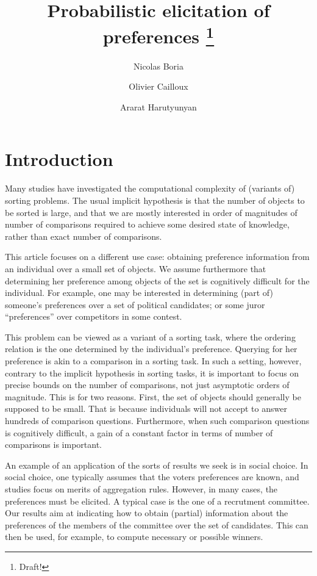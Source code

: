 \documentclass[version=3.21, pagesize, twoside=off, bibliography=totoc, DIV=calc, fontsize=12pt, a4paper]{scrartcl}
\title{Probabilistic elicitation of preferences \thanks{Draft!}}
\author{Nicolas Boria}
\author{Olivier Cailloux}
\author{Ararat Harutyunyan}
\affil{Université Paris-Dauphine, PSL Research University, CNRS, LAMSADE, 75016 PARIS, FRANCE\\
	\href{mailto:olivier.cailloux@dauphine.fr}{olivier.cailloux@dauphine.fr}
}
\begin{document}
\maketitle

\section{Introduction}
Many studies have investigated the computational complexity of (variants of) sorting problems. The usual implicit hypothesis is that the number of objects to be sorted is large, and that we are mostly interested in order of magnitudes of number of comparisons required to achieve some desired state of knowledge, rather than exact number of comparisons.

This article focuses on a different use case: obtaining preference information from an individual over a small set of objects. We assume furthermore that determining her preference among objects of the set is cognitively difficult for the individual. For example, one may be interested in determining (part of) someone’s preferences over a set of political candidates; or some juror “preferences” over competitors in some contest.

This problem can be viewed as a variant of a sorting task, where the ordering relation is the one determined by the individual’s preference. Querying for her preference is akin to a comparison in a sorting task. In such a setting, however, contrary to the implicit hypothesis in sorting tasks, it is important to focus on precise bounds on the number of comparisons, not just asymptotic orders of magnitude. This is for two reasons. First, the set of objects should generally be supposed to be small. That is because individuals will not accept to answer hundreds of comparison questions. Furthermore, when such comparison questions is cognitively difficult, a gain of a constant factor in terms of number of comparisons is important.

An example of an application of the sorts of results we seek is in social choice. In social choice, one typically assumes that the voters preferences are known, and studies focus on merits of aggregation rules. However, in many cases, the preferences must be elicited. A typical case is the one of a recrutment committee. Our results aim at indicating how to obtain (partial) information about the preferences of the members of the committee over the set of candidates. This can then be used, for example, to compute necessary or possible winners.
\end{document}
